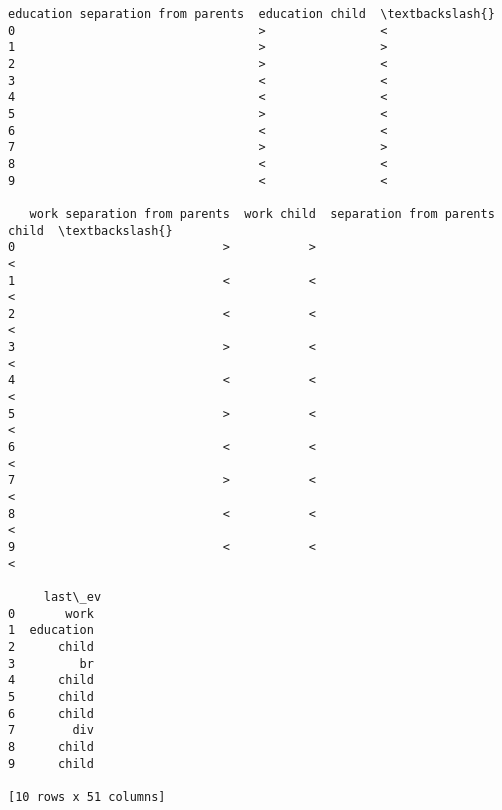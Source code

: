 \documentclass[11pt]{article}
\begin{document}
\begin{Verbatim}[commandchars=\\\{\}]
   education separation from parents  education child  \textbackslash{}
0                                  >                <   
1                                  >                >   
2                                  >                <   
3                                  <                <   
4                                  <                <   
5                                  >                <   
6                                  <                <   
7                                  >                >   
8                                  <                <   
9                                  <                <   

   work separation from parents  work child  separation from parents child  \textbackslash{}
0                             >           >                              <   
1                             <           <                              <   
2                             <           <                              <   
3                             >           <                              <   
4                             <           <                              <   
5                             >           <                              <   
6                             <           <                              <   
7                             >           <                              <   
8                             <           <                              <   
9                             <           <                              <   

     last\_ev  
0       work  
1  education  
2      child  
3         br  
4      child  
5      child  
6      child  
7        div  
8      child  
9      child  

[10 rows x 51 columns]

    \end{Verbatim}
\end{document}
